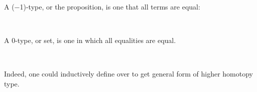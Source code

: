 A (−1)-type, or the proposition, is one that all terms are equal:

\begin{code}%
\>[0]\AgdaSpace{}%
\AgdaSymbol{:}\AgdaSpace{}%
\AgdaSpace{}%
\AgdaSpace{}%
\<%
\\
\>[0]\AgdaSpace{}%
\AgdaSpace{}%
\AgdaSymbol{=}\AgdaSpace{}%
\AgdaSymbol{(}\AgdaSpace{}%
\AgdaSpace{}%
\AgdaSymbol{:}\AgdaSpace{}%
\AgdaSymbol{)}\AgdaSpace{}%
\AgdaSpace{}%
\AgdaSpace{}%
\AgdaSpace{}%
\<%
\end{code}

A 0-type, or set, is one in which all equalities are equal.

\begin{code}%
\>[0]\AgdaSpace{}%
\AgdaSymbol{:}\AgdaSpace{}%
\AgdaSpace{}%
\AgdaSpace{}%
\<%
\\
\>[0]\AgdaSpace{}%
\AgdaSpace{}%
\AgdaSymbol{=}\AgdaSpace{}%
\AgdaSymbol{(}\AgdaSpace{}%
\AgdaSpace{}%
\AgdaSymbol{:}\AgdaSpace{}%
\AgdaSymbol{)}\AgdaSpace{}%
\AgdaSymbol{(}\AgdaSpace{}%
\AgdaSpace{}%
\AgdaSymbol{:}\AgdaSpace{}%
\AgdaSpace{}%
\AgdaSpace{}%
\AgdaSymbol{)}\AgdaSpace{}%
\AgdaSpace{}%
\AgdaSpace{}%
\AgdaSpace{}%
\<%
\end{code}

Indeed, one could inductively define  over  to get general form of higher homotopy type.

\begin{code}%
\>[0]\AgdaSpace{}%
\AgdaSymbol{:}\AgdaSpace{}%
\AgdaSpace{}%
\AgdaSpace{}%
\AgdaSpace{}%
\AgdaSpace{}%
\<%
\\
\>[0]\AgdaSpace{}%
\AgdaSpace{}%
\AgdaSpace{}%
\AgdaSymbol{=}\AgdaSpace{}%
\AgdaSpace{}%
\<%
\\
\>[0]\AgdaSpace{}%
\AgdaSymbol{(}\AgdaSpace{}%
\AgdaSymbol{)}\AgdaSpace{}%
\AgdaSpace{}%
\AgdaSymbol{=}\AgdaSpace{}%
\AgdaSymbol{(}\AgdaSpace{}%
\AgdaSpace{}%
\AgdaSymbol{:}\AgdaSpace{}%
\AgdaSymbol{)}\AgdaSpace{}%
\AgdaSpace{}%
\AgdaSpace{}%
\AgdaSpace{}%
\AgdaSymbol{(}\AgdaSpace{}%
\AgdaSpace{}%
\AgdaSymbol{)}\<%
\end{code}

